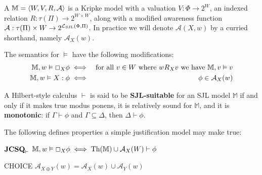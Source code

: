 \begin{definition}
  \label{justmodels}A {} $\mathbbm{M}=
  \langle W, V, R, \mathcal{A} \rangle$ is a Kripke model with a valuation $V
  : \Phi  \rightarrow 2^W$, an indexed relation $R : \tau (\Pi) \rightarrow
  2^{W \times W}$, along with a modified awareness function
  $\mathcal{A} : \tau (\Pi) \times W
   \rightarrow 2^{\mathcal{L}_{\tmop{SJL}} (\Phi, \Pi)}$. 
  In practice we will denote $\mathcal{A} (X, w)$ by a curried shorthand, namely $\mathcal{A}_X (w)$.
  
  The semantics for $\vDash$ have the following modifications:
  \begin{eqnarray*}
    \mathbbm{M}, w \vDash \Box_X \phi & \iff & \text{for all $v \in W$
    where $w R_X v$ we have $\mathbbm{M}, v \vDash v$}\\
    \mathbbm{M}, w \vDash X : \phi & \iff & \phi \in \mathcal{A}_X (w)
  \end{eqnarray*}
\end{definition}

\begin{definition}
A Hilbert-style calculus $\vdash$ is said to be \textbf{SJL-suitable} for an SJL model
$\mathbb{M}$ if and only if it makes true modus ponens, it is
relatively sound for $\mathbb{M}$, and it is \textbf{monotonic}: if
$\Gamma \vdash \phi$ and $\Gamma \subseteq \Delta$, then $\Delta
\vdash \phi$.
\end{definition}

\begin{definition}
  The following defines properties a simple justification model may make true:
  
  \begin{descriptiondash}
    \item[$\textup{\textbf{JCSQ}}_\vdash$] $\mathbbm{M}, w \vDash \Box_X \phi \iff \tmop{Th}
    (\mathbbm{M}) \cup \mathcal{A}_X (W) \vdash \phi$
    \item[CHOICE] $\mathcal{A}_{X \oplus Y}(w) = \mathcal{A}_X (w) \cup
    \mathcal{A}_Y (w)$
  \end{descriptiondash}
\end{definition}

